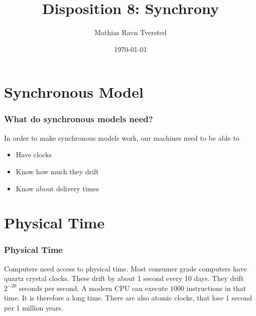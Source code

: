 
\newcommand{\N}{\mathbb{N}}
\title{Disposition 8: Synchrony}   
\author{Mathias Ravn Tversted} 
\date{\today} 




\frame{\titlepage} 







\section{Synchronous Model}
        \begin{frame}
            \frametitle{What do synchronous models need?}
            In order to make synchronous models work, our machines need to be able to
                \begin{itemize}
                    \item Have clocks
                    \item Know how much they drift
                    \item Know about delivery times
                \end{itemize}    
        \end{frame}
\section{Physical Time}
        \begin{frame}
            \frametitle{Physical Time}   
            Computers need access to physical time. Most consumer grade computers have quartz crystal clocks. These drift by about 1 second every 10 days. They drift $2^{-20}$ seconds per second. A modern CPU can execute $1000$ instructions in that time. It is therefore a long time. There are also atomic clocks, that lose 1 second per 1 million years. 
        \end{frame}
